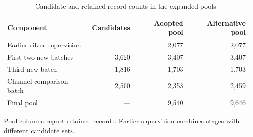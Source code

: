 \begin{table}[!htbp]
\centering\small
\caption{Candidate and retained record counts in the expanded pools.}
\label{tab:source-stages}
\begin{tabularx}{\linewidth}{@{}Lrrr@{}}
\toprule Component & Candidates & Adopted pool & Alternative pool \\
\midrule
Earlier silver supervision & --- & 2,077 & 2,077 \\
First two new batches & 3,620 & 3,407 & 3,407 \\
Third new batch & 1,816 & 1,703 & 1,703 \\
Channel-comparison batch & 2,500 & 2,353 & 2,459 \\
\midrule
Final pool & --- & 9,540 & 9,646 \\
\bottomrule
\end{tabularx}
\par\smallskip\footnotesize\RaggedRight
Pool columns report retained records. Earlier supervision combines stages with different candidate sets.
\end{table}
